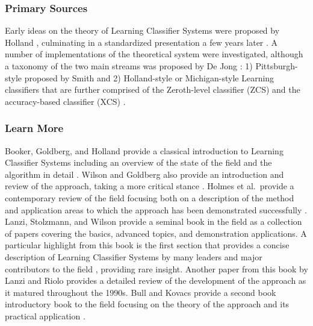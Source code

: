 % 
% 
\subsubsection{Primary Sources}
Early ideas on the theory of Learning Classifier Systems were proposed by Holland \cite{Holland1976, Holland1977}, culminating in a standardized presentation a few years later \cite{Holland1980}.
A number of implementations of the theoretical system were investigated, although a taxonomy of the two main streams was proposed by De Jong \cite{Jong1988}: 1) Pittsburgh-style proposed by Smith \cite{Smith1980, Smith1983} and 2) Holland-style or Michigan-style Learning classifiers that are further comprised of the Zeroth-level classifier (ZCS) \cite{Wilson1994} and the accuracy-based classifier (XCS) \cite{Wilson1995}.

% 
% 
\subsubsection{Learn More}
Booker, Goldberg, and Holland provide a classical introduction to Learning Classifier Systems including an overview of the state of the field and the algorithm in detail \cite{Booker1989}. Wilson and Goldberg also provide an introduction and review of the approach, taking a more critical stance \cite{Wilson1989}.
Holmes et al.\ provide a contemporary review of the field focusing both on a description of the method and application areas to which the approach has been demonstrated successfully \cite{Holmes2002}.
Lanzi, Stolzmann, and Wilson provide a seminal book in the field as a collection of papers covering the basics, advanced topics, and demonstration applications. A particular highlight from this book is the first section that provides a concise description of Learning Classifier Systems by many leaders and major contributors to the field \cite{Holland2000}, providing rare insight. Another paper from this book by Lanzi and Riolo provides a detailed review of the development of the approach as it matured throughout the 1990s.
Bull and Kovacs provide  a second book introductory book to the field focusing on the theory of the approach and its practical application \cite{Bull2005}.


